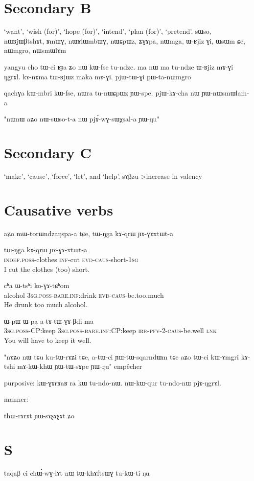 \documentclass[oldfontcommands,oneside,a4paper,11pt]{article}
\newcommand{\ipa}[1]{{\phon #1}} %
\begin{document}
 
  \section{Secondary B} 
 ‘want’, ‘wish (for)’, ‘hope (for)’, ‘intend’, ‘plan (for)’, ‘pretend’.
sɯso, nɯʁjɯβtshɤt, ʁmɯɣ, nɯʁlɯmbɯɣ, nɯɕpɯz, ʑɣɤpa, nɯmga, ɯ-ʁjiz ɣi, ɯsɯm ɕe, nɯmgro, nɯsmɯlɤm

yangyu cho tɯ-ci ʁɟa ʑo nɯ kɯ-fse tu-ndze.
ma nɯ ma tu-ndze ɯ-ʁjiz mɤ-ɣi ŋgrɤl.
kɤ-nɤma tɯ-ʁjɯz maka mɤ-ɣi.
pjɯ-tɯ-ɣi pɯ-ta-nɯmgro

qachɣa kɯ-mbri kɯ-fse, nɯra tu-nɯɕpɯz ɲɯ-spe. 
pjɯ-kɤ-cha nɯ ɲɯ-nɯsmɯlam-a


"nɯnɯ aʑo nɯ-sɯso-t-a nɯ pjɤ́-wɣ-sɯχsal-a ɲɯ-ŋu" 
  \section{Secondary C} 
‘make’, ‘cause’, ‘force’, ‘let’, and ‘help’.
sɤβzu
>increase in valency
\section{Causative verbs}
aʑo mɯ-torɯndzaŋspa-a tɕe, tɯ-ŋga kɤ-qrɯ ɲɤ-ɣɤxtɯt-a



 \begin{exe}
\ex \label{ex:GAxtWt}
\gll
\ipa{tɯ-ŋga}  	\ipa{kɤ-qrɯ}  	\ipa{ɲɤ-ɣɤ-xtɯt-a}  \\
\textsc{indef.poss}-clothes \textsc{inf}-cut \textsc{evd-caus}-short-\textsc{1sg}\\
 \glt I cut the clothes (too) short.
\end{exe}

 \begin{exe}
\ex \label{ex:koGAtChom}
\gll
\ipa{cʰa} \ipa{ɯ-tsʰi} \ipa{ko-ɣɤ-tɕʰom} \\
alcohol \textsc{3sg.poss}-\textsc{bare.inf}:drink \textsc{evd-caus}-be.too.much \\
\glt He drunk too much alcohol.
\end{exe}
 \begin{exe}
\ex \label{ex:atAtWGABdi}
\gll
\ipa{ɯ-pɯ}  	\ipa{ɯ-pa}  	\ipa{a-tɤ-tɯ-ɣɤ-βdi}  	\ipa{ma}  \\
\textsc{3sg.poss}-CP:keep \textsc{3sg.poss}-\textsc{bare.inf}:CP:keep \textsc{irr-pfv-2-caus}-be.well \textsc{lnk} \\
\glt You will have to keep it well.
\end{exe}


"nɤʑo nɯ tɕu ku-tɯ-rɤʑi tɕe, a-tɯ-ci ɲɯ-tɯ-sqarndɯm tɕe aʑo
tɯ-ci kɯ-ɤmgri kɤ-tshi mɤ-kɯ-khɯ ɲɯ-tɯ-sɤpe ɲɯ-ŋu"
empêcher

purposive:
kɯ-ɣɤrʁaʁ ra kɯ tu-ndo-nɯ.
nɯ-kɯ-qur tu-ndo-nɯ pjɤ-ŋgrɤl.

  
 
manner:

thɯ-rɤrɤt ɲɯ-sɤʂɤʂɤt ʑo

\section{S}

\ipa{taqaβ} 	\ipa{ci} 	\ipa{chɯ́-wɣ-lɤt} 	\ipa{nɯ} 	\ipa{tɯ-khɤftsɯɣ} 	\ipa{tu-kɯ-ti} 	\ipa{ŋu} 




\end{document}
